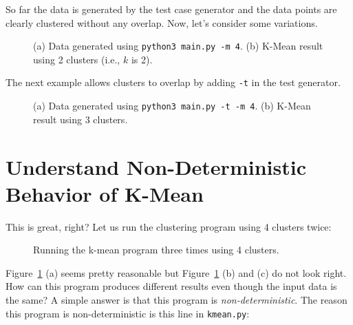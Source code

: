 \clearpage
So far the data is generated by the test case generator and the data
points are clearly clustered without any overlap.  Now, let's consider
some variations.

\begin{figure}[h] \centering
\caption{(a) Data generated using {\tt  python3 main.py -m 4}.
(b) K-Mean result using 2 clusters (i.e., $k$ is 2). }
\end{figure}

\clearpage

The next example allows clusters to overlap by adding {\tt -t} in
the test generator.

\begin{figure}[h] \centering
\caption{(a) Data generated using {\tt  python3 main.py -t -m 4}.
(b) K-Mean result using 3 clusters. }
\end{figure}

\clearpage

\section{Understand Non-Deterministic Behavior of K-Mean}

This is great, right? Let us run the clustering program using 4 clusters
twice:

\begin{figure}[h] \centering
\caption{Running the k-mean program three times using 4 clusters. }
\label{figure:kmean:1112}
\end{figure}

\clearpage

Figure~\ref{figure:kmean:1112} (a) seems pretty reasonable
but Figure~\ref{figure:kmean:1112} (b) and (c) do not look right.
How can this program produces different
results even though the input data is the same?  A simple
answer is that this program is {\it non-deterministic}.
The reason this program is non-deterministic is this line in
{\tt kmean.py}:

